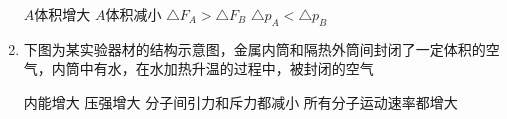 \begin{enumerate}[leftmargin=0em]
\fourchoices
{$ A $体积增大 }
{$ A $体积减小}
{$ \triangle F_A> \triangle F_B $ }
{$ \triangle p_A< \triangle p_B $}

\item 
{}
下图为某实验器材的结构示意图，金属内筒和隔热外筒间封闭了一定体积的空气，内筒中有水，在水加热升温的过程中，被封闭的空气  
\begin{figure}[h!]
\centering

\end{figure}

\fourchoices
{内能增大}
{压强增大}
{分子间引力和斥力都减小}
{所有分子运动速率都增大}






\end{enumerate}


